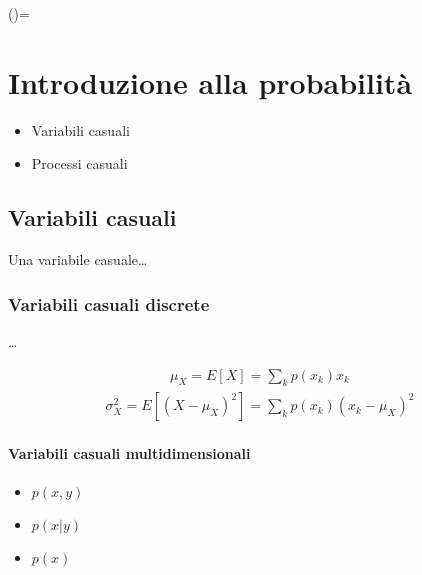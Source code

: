 \documentclass[letterpaper,10pt,italian]{jupyterBook}
\begin{document}
\sphinxAtStartPar
()=


\chapter{Introduzione alla probabilità}
\label{\detokenize{ch/statistics/probability:introduzione-alla-probabilita}}\label{\detokenize{ch/statistics/probability::doc}}\begin{itemize}
\item {} 
\sphinxAtStartPar
Variabili casuali

\item {} 
\sphinxAtStartPar
Processi casuali

\end{itemize}

\sphinxstepscope


\section{Variabili casuali}
\label{\detokenize{ch/statistics/random_variables:variabili-casuali}}\label{\detokenize{ch/statistics/random_variables:statistics-hs-random-variables}}\label{\detokenize{ch/statistics/random_variables::doc}}
\sphinxAtStartPar
{} Una variabile casuale…


\subsection{Variabili casuali discrete}
\label{\detokenize{ch/statistics/random_variables:variabili-casuali-discrete}}
\sphinxAtStartPar
…

\sphinxAtStartPar
{}
\begin{equation*}
\begin{split}\mu_X = E[X] = \sum_k p(x_k) x_k\end{split}
\end{equation*}
\sphinxAtStartPar
{}
\begin{equation*}
\begin{split}\sigma^2_X = E[(X-\mu_X)^2] = \sum_k p(x_k) (x_k - \mu_X)^2\end{split}
\end{equation*}
\sphinxAtStartPar
{}


\subsubsection{Variabili casuali multi\sphinxhyphen{}dimensionali}
\label{\detokenize{ch/statistics/random_variables:variabili-casuali-multi-dimensionali}}\begin{itemize}
\item {} 
\sphinxAtStartPar
{} \(p(x,y)\)

\item {} 
\sphinxAtStartPar
{} \(p(x|y)\)

\item {} 
\sphinxAtStartPar
{} \(p(x)\)

\end{itemize}
\end{document}

